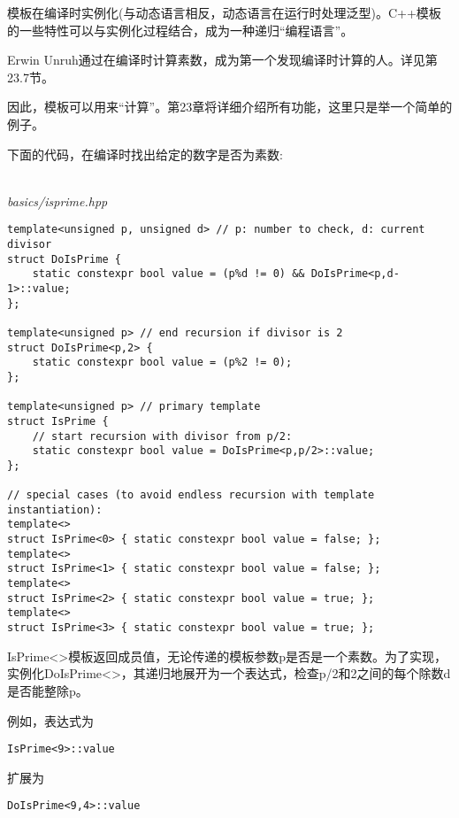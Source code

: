 模板在编译时实例化(与动态语言相反，动态语言在运行时处理泛型)。C++模板的一些特性可以与实例化过程结合，成为一种递归“编程语言”。

\begin{tcolorbox}[colback=webgreen!5!white,colframe=webgreen!75!black]
\hspace*{0.75cm}Erwin Unruh通过在编译时计算素数，成为第一个发现编译时计算的人。详见第23.7节。
\end{tcolorbox}

因此，模板可以用来“计算”。第23章将详细介绍所有功能，这里只是举一个简单的例子。

下面的代码，在编译时找出给定的数字是否为素数:

\hspace*{\fill} \\ %
\noindent
\textit{basics/isprime.hpp}
\begin{lstlisting}[style=styleCXX]
template<unsigned p, unsigned d> // p: number to check, d: current divisor
struct DoIsPrime {
	static constexpr bool value = (p%d != 0) && DoIsPrime<p,d-1>::value;
};

template<unsigned p> // end recursion if divisor is 2
struct DoIsPrime<p,2> {
	static constexpr bool value = (p%2 != 0);
};

template<unsigned p> // primary template
struct IsPrime {
	// start recursion with divisor from p/2:
	static constexpr bool value = DoIsPrime<p,p/2>::value;
};

// special cases (to avoid endless recursion with template instantiation):
template<>
struct IsPrime<0> { static constexpr bool value = false; };
template<>
struct IsPrime<1> { static constexpr bool value = false; };
template<>
struct IsPrime<2> { static constexpr bool value = true; };
template<>
struct IsPrime<3> { static constexpr bool value = true; };
\end{lstlisting}

IsPrime<>模板返回成员值，无论传递的模板参数p是否是一个素数。为了实现，实例化DoIsPrime<>，其递归地展开为一个表达式，检查p/2和2之间的每个除数d是否能整除p。

例如，表达式为

\begin{lstlisting}[style=styleCXX]
IsPrime<9>::value
\end{lstlisting}

扩展为

\begin{lstlisting}[style=styleCXX]
DoIsPrime<9,4>::value
\end{lstlisting}


